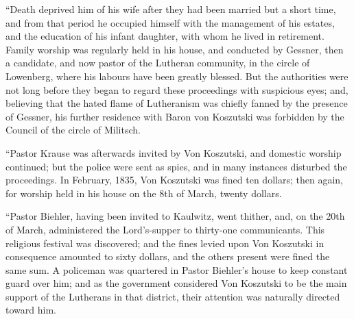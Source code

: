 ``Death deprived him of his wife
after they had been married but a short time, and from that period he
occupied himself with the management of his estates, and the education
of his infant daughter, with whom he lived in retirement. Family worship
was regularly held in his house, and conducted by Gessner, then a
candidate, and now pastor of the Lutheran community, in the circle of
Lowenberg, where his labours have been greatly blessed. But the
authorities were not long before they began to regard these proceedings
with suspicious eyes; and, believing that the hated flame of Lutheranism
was chiefly fanned by the presence of Gessner, his further residence
with Baron von Koszutski was forbidden by the Council of the circle of
Militsch.

``Pastor Krause was afterwards
invited by Von Koszutski, and domestic worship continued; but the police
were sent as spies, and in many instances disturbed the proceedings. In
February, 1835, Von Koszutski was fined ten
dollars; then again, for worship held in his house on the 8th of March,
twenty dollars.

``Pastor Biehler, having been invited
to Kaulwitz, went thither, and, on the 20th of March, administered the
Lord's-supper to thirty-one communicants. This religious festival was
discovered; and the fines levied upon Von Koszutski in consequence
amounted to sixty dollars, and the others present were fined the same
sum. A policeman was quartered in Pastor Biehler's house to keep
constant guard over him; and as the government considered Von Koszutski
to be the main support of the Lutherans in that district, their
attention was naturally directed toward him.

